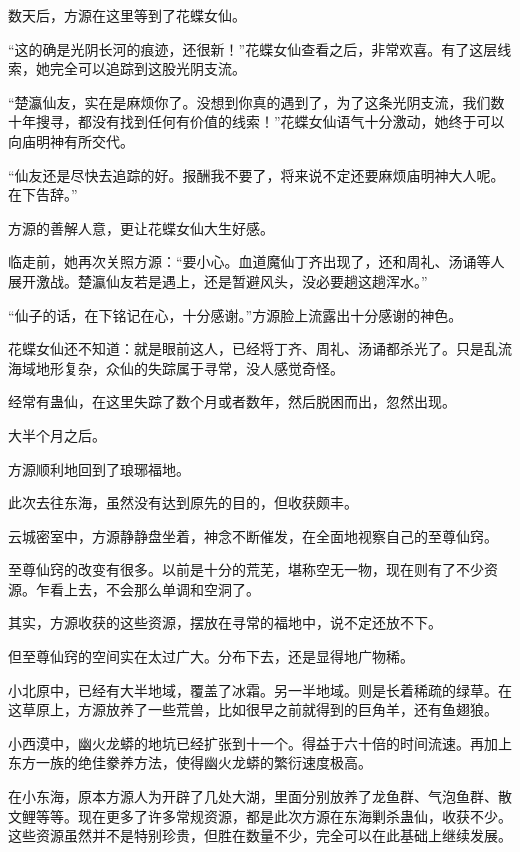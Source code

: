 
\begin{this_body}

数天后，方源在这里等到了花蝶女仙。

“这的确是光阴长河的痕迹，还很新！”花蝶女仙查看之后，非常欢喜。有了这层线索，她完全可以追踪到这股光阴支流。

“楚瀛仙友，实在是麻烦你了。没想到你真的遇到了，为了这条光阴支流，我们数十年搜寻，都没有找到任何有价值的线索！”花蝶女仙语气十分激动，她终于可以向庙明神有所交代。

“仙友还是尽快去追踪的好。报酬我不要了，将来说不定还要麻烦庙明神大人呢。在下告辞。”

方源的善解人意，更让花蝶女仙大生好感。

临走前，她再次关照方源：“要小心。血道魔仙丁齐出现了，还和周礼、汤诵等人展开激战。楚瀛仙友若是遇上，还是暂避风头，没必要趟这趟浑水。”

“仙子的话，在下铭记在心，十分感谢。”方源脸上流露出十分感谢的神色。

花蝶女仙还不知道：就是眼前这人，已经将丁齐、周礼、汤诵都杀光了。只是乱流海域地形复杂，众仙的失踪属于寻常，没人感觉奇怪。

经常有蛊仙，在这里失踪了数个月或者数年，然后脱困而出，忽然出现。

大半个月之后。

方源顺利地回到了琅琊福地。

此次去往东海，虽然没有达到原先的目的，但收获颇丰。

云城密室中，方源静静盘坐着，神念不断催发，在全面地视察自己的至尊仙窍。

至尊仙窍的改变有很多。以前是十分的荒芜，堪称空无一物，现在则有了不少资源。乍看上去，不会那么单调和空洞了。

其实，方源收获的这些资源，摆放在寻常的福地中，说不定还放不下。

但至尊仙窍的空间实在太过广大。分布下去，还是显得地广物稀。

小北原中，已经有大半地域，覆盖了冰霜。另一半地域。则是长着稀疏的绿草。在这草原上，方源放养了一些荒兽，比如很早之前就得到的巨角羊，还有鱼翅狼。

小西漠中，幽火龙蟒的地坑已经扩张到十一个。得益于六十倍的时间流速。再加上东方一族的绝佳豢养方法，使得幽火龙蟒的繁衍速度极高。

在小东海，原本方源人为开辟了几处大湖，里面分别放养了龙鱼群、气泡鱼群、散文鲤等等。现在更多了许多常规资源，都是此次方源在东海剿杀蛊仙，收获不少。这些资源虽然并不是特别珍贵，但胜在数量不少，完全可以在此基础上继续发展。


\end{this_body}
